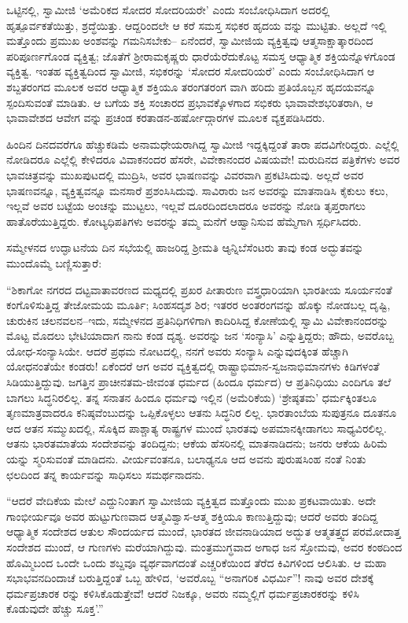 ಒಟ್ಟಿನಲ್ಲಿ, ಸ್ವಾಮೀಜಿ ‘ಅಮೆರಿಕದ ಸೋದರ ಸೋದರಿಯರೇ’ ಎಂದು ಸಂಬೋಧಿಸಿದಾಗ ಅದರಲ್ಲಿ ಹೃತ್ಪೂರ್ವಕತೆಯಿತ್ತು, ಶ್ರದ್ಧೆಯಿತ್ತು. ಆದ್ದರಿಂದಲೇ ಆ ಕರೆ ಸಮಸ್ತ ಸಭಿಕರ ಹೃದಯ ವನ್ನು ಮುಟ್ಟಿತು. ಅಲ್ಲದೆ ಇಲ್ಲಿ ಮತ್ತೊಂದು ಪ್ರಮುಖ ಅಂಶವನ್ನು ಗಮನಿಸಬೇಕು– ಏನೆಂದರೆ, ಸ್ವಾಮೀಜಿಯ ವ್ಯಕ್ತಿತ್ವವು ಆತ್ಮಸಾಕ್ಷಾತ್ಕಾರದಿಂದ ಪರಿಪೂರ್ಣಗೊಂಡ ವ್ಯಕ್ತಿತ್ವ; ಜೊತೆಗೆ ಶ್ರೀರಾಮಕೃಷ್ಣರು ಧಾರೆಯೆರೆದುಕೊಟ್ಟ ಸಮಸ್ತ ಆಧ್ಯಾತ್ಮಿಕ ಶಕ್ತಿಯನ್ನೊಳಗೊಂಡ ವ್ಯಕ್ತಿತ್ವ. ಇಂತಹ ವ್ಯಕ್ತಿತ್ವದಿಂದ ಸ್ವಾಮೀಜಿ, ಸಭಿಕರನ್ನು ‘ಸೋದರ ಸೋದರಿಯರೆ’ ಎಂದು ಸಂಬೋಧಿಸಿದಾಗ ಆ ಶಬ್ದತರಂಗದ ಮೂಲಕ ಅವರ ಆಧ್ಯಾತ್ಮಿಕ ಶಕ್ತಿಯೂ ತರಂಗತರಂಗ ವಾಗಿ ಹರಿದು ಪ್ರತಿಯೊಬ್ಬನ ಹೃದಯವನ್ನೂ ಸ್ಪಂದಿಸುವಂತೆ ಮಾಡಿತು. ಆ ಬಗೆಯ ಶಕ್ತಿ ಸಂಚಾರದ ಪ್ರಭಾವಕ್ಕೊಳಗಾದ ಸಭಿಕರು ಭಾವಾವೇಶಭರಿತರಾಗಿ, ಆ ಭಾವಾವೇಶದ ಆವೇಗ ವನ್ನು ಪ್ರಚಂಡ ಕರತಾಡನ-ಹರ್ಷೋದ್ಗಾರಗಳ ಮೂಲಕ ವ್ಯಕ್ತಪಡಿಸಿದರು.

ಹಿಂದಿನ ದಿನದವರೆಗೂ ಹೆಚ್ಚುಕಡಿಮೆ ಅನಾಮಧೇಯರಾಗಿದ್ದ ಸ್ವಾಮೀಜಿ ಇದ್ದಕ್ಕಿದ್ದಂತೆ ತಾರಾ ಪದವಿಗೇರಿದ್ದರು. ಎಲ್ಲೆಲ್ಲಿ ನೋಡಿದರೂ ಎಲ್ಲೆಲ್ಲಿ ಕೇಳಿದರೂ ವಿವಾಕನಂದರ ಹೆಸರೇ, ವಿವೇಕಾನಂದರ ವಿಷಯವೇ! ಮರುದಿನದ ಪತ್ರಿಕೆಗಳು ಅವರ ಭಾವಚಿತ್ರವನ್ನು ಮುಖಪುಟದಲ್ಲಿ ಮುದ್ರಿಸಿ, ಅವರ ಭಾಷಣವನ್ನು ವಿವರವಾಗಿ ಪ್ರಕಟಿಸಿದುವು. ಅಲ್ಲದೆ ಅವರ ಭಾಷಣವನ್ನೂ, ವ್ಯಕ್ತಿತ್ವವನ್ನೂ ಮನಸಾರೆ ಪ್ರಶಂಸಿಸಿದುವು. ಸಾವಿರಾರು ಜನ ಅವರನ್ನು ಮಾತನಾಡಿಸಿ ಕೈಕುಲು ಕಲು, ಇಲ್ಲವೆ ಅವರ ಬಟ್ಟೆಯ ಅಂಚನ್ನು ಮುಟ್ಟಲು, ಇಲ್ಲವೆ ದೂರದಿಂದಲಾದರೂ ಅವರನ್ನು ನೋಡಿ ತೃಪ್ತರಾಗಲು ಹಾತೊರೆಯುತ್ತಿದ್ದರು. ಕೋಟ್ಯಧಿಪತಿಗಳು ಅವರನ್ನು ತಮ್ಮ ಮನೆಗೆ ಆಹ್ವಾನಿಸುವ ಹೆಮ್ಮೆಗಾಗಿ ಸ್ಪರ್ಧಿಸಿದರು.

ಸಮ್ಮೇಳನದ ಉದ್ಘಾಟನೆಯ ದಿನ ಸಭೆಯಲ್ಲಿ ಹಾಜರಿದ್ದ ಶ್ರೀಮತಿ ಆ್ಯನ್ನಿಬೆಸೆಂಟರು ತಾವು ಕಂಡ ಅದ್ಭುತವನ್ನು ಮುಂದೊಮ್ಮೆ ಬಣ್ಣಿಸುತ್ತಾರೆ:

“ಶಿಕಾಗೋ ನಗರದ ದಟ್ಟವಾತಾವರಣದ ಮಧ್ಯದಲ್ಲಿ ಪ್ರಖರ ಪೀತಾರುಣ ವಸ್ತ್ರಧಾರಿಯಾಗಿ ಭಾರತೀಯ ಸೂರ್ಯನಂತೆ ಕಂಗೊಳಿಸುತ್ತಿದ್ದ ತೇಜೋಮಯ ಮೂರ್ತಿ; ಸಿಂಹಸದೃಶ ಶಿರ; ಇತರರ ಅಂತರಂಗವನ್ನು ಹೊಕ್ಕು ನೋಡಬಲ್ಲ ದೃಷ್ಟಿ, ಚುರುಕಿನ ಚಲನವಲನ–ಇದು, ಸಮ್ಮೇಳನದ ಪ್ರತಿನಿಧಿಗಳಿಗಾಗಿ ಕಾದಿರಿಸಿದ್ದ ಕೋಣೆಯಲ್ಲಿ ಸ್ವಾಮಿ ವಿವೇಕಾನಂದರನ್ನು ಮೊಟ್ಟ ಮೊದಲು ಭೇಟಿಯಾದಾಗ ನಾನು ಕಂಡ ದೃಶ್ಯ. ಅವರನ್ನು ಜನ ‘ಸಂನ್ಯಾಸಿ’ ಎನ್ನುತ್ತಿದ್ದರು; ಹೌದು, ಅವರೊಬ್ಬ ಯೋಧ-ಸಂನ್ಯಾಸಿಯೇ. ಆದರೆ ಪ್ರಥಮ ನೋಟದಲ್ಲಿ, ನನಗೆ ಅವರು ಸಂನ್ಯಾಸಿ ಎನ್ನುವುದಕ್ಕಿಂತ ಹೆಚ್ಚಾಗಿ ಯೋಧನಂತೆಯೇ ಕಂಡರು! ಏಕೆಂದರೆ ಆಗ ಅವರ ವ್ಯಕ್ತಿತ್ವದಲ್ಲಿ ರಾಷ್ಟ್ರಾಭಿಮಾನ-ಸ್ವಜನಾಭಿಮಾನಗಳು ಕಿಡಿಗಳಂತೆ ಸಿಡಿಯುತ್ತಿದ್ದುವು. ಜಗತ್ತಿನ ಪ್ರಾಚೀನತಮ-ಜೀವಂತ ಧರ್ಮದ (ಹಿಂದೂ ಧರ್ಮದ) ಆ ಪ್ರತಿನಿಧಿಯು ಎಂದಿಗೂ ತಲೆ ಬಾಗಲು ಸಿದ್ಧನಿರಲಿಲ್ಲ. ತನ್ನ ಸನಾತನ ಹಿಂದೂ ಧರ್ಮವು ಇಲ್ಲಿನ (ಅಮೆರಿಕೆಯ) ‘ಶ್ರೇಷ್ಠತಮ’ ಧರ್ಮಕ್ಕಿಂತಲೂ ತೃಣಮಾತ್ರವಾದರೂ ಕನಿಷ್ಠವೆಂಬುದನ್ನು ಒಪ್ಪಿಕೊಳ್ಳಲು ಆತನು ಸಿದ್ಧನಿರ ಲಿಲ್ಲ. ಭಾರತಾಂಬೆಯ ಸುಪುತ್ರನೂ ದೂತನೂ ಆದ ಆತನ ಸಮ್ಮುಖದಲ್ಲಿ, ಸೊಕ್ಕಿದ ಪಾಶ್ಚಾತ್ಯ ರಾಷ್ಟ್ರಗಳ ಮುಂದೆ ಭಾರತವು ಅಪಮಾನಕ್ಕೀಡಾಗಲು ಸಾಧ್ಯವಿರಲಿಲ್ಲ. ಆತನು ಭಾರತಮಾತೆಯ ಸಂದೇಶವನ್ನು ತಂದಿದ್ದನು; ಆಕೆಯ ಹೆಸರಿನಲ್ಲಿ ಮಾತನಾಡಿದನು; ಜನರು ಆಕೆಯ ಹಿರಿಮೆ ಯನ್ನು ಸ್ಮರಿಸುವಂತೆ ಮಾಡಿದನು. ವೀರ್ಯವಂತನೂ, ಬಲಾಢ್ಯನೂ ಆದ ಅವನು ಪುರುಷಸಿಂಹ ನಂತೆ ನಿಂತು ಛಲದಿಂದ ತನ್ನ ಕಾರ್ಯವನ್ನು ಸಾಧಿಸಲು ಸಮರ್ಥನಾದನು.

“ಆದರೆ ವೇದಿಕೆಯ ಮೇಲೆ ಎದ್ದುನಿಂತಾಗ ಸ್ವಾಮೀಜಿಯ ವ್ಯಕ್ತಿತ್ವದ ಮತ್ತೊಂದು ಮುಖ ಪ್ರಕಟವಾಯಿತು. ಅದೇ ಗಾಂಭೀರ್ಯವೂ ಅವರ ಹುಟ್ಟುಗುಣವಾದ ಆತ್ಮವಿಶ್ವಾಸ-ಆತ್ಮ ಶಕ್ತಿಯೂ ಕಾಣುತ್ತಿದ್ದುವು; ಆದರೆ ಅವರು ತಂದಿದ್ದ ಆಧ್ಯಾತ್ಮಿಕ ಸಂದೇಶದ ಆತುಲ ಸೌಂದರ್ಯದ ಮುಂದೆ, ಭಾರತದ ಜೀವನಾಡಿಯಾದ ಅದ್ಭುತ ಆತ್ಮತತ್ತ್ವದ ಪರಮೋದಾತ್ತ ಸಂದೇಶದ ಮುಂದೆ, ಆ ಗುಣಗಳು ಮರೆಯಾಗಿದ್ದುವು. ಮಂತ್ರಮುಗ್ಧವಾದ ಅಗಾಧ ಜನ ಸ್ತೋಮವು, ಅವರ ಕಂಠದಿಂದ ಹೊಮ್ಮಿಬಂದ ಒಂದೇ ಒಂದು ಶಬ್ದವೂ ವ್ಯರ್ಥವಾಗದಂತೆ ಎಚ್ಚರಿಕೆಯಿಂದ ತೆರೆದ ಕಿವಿಗಳಿಂದ ಆಲಿಸಿತು. ಆ ಮಹಾ ಸಭಾಭವನದಿಂದಾಚೆ ಬರುತ್ತಿದ್ದಂತೆ ಒಬ್ಬ ಹೇಳಿದ, ‘ಅವರೊಬ್ಬ “ಅನಾಗರಿಕ ವಿಧರ್ಮಿ”! ನಾವು ಅವರ ದೇಶಕ್ಕೆ ಧರ್ಮಪ್ರಚಾರಕ ರನ್ನು ಕಳಿಸಿಕೊಡುತ್ತೇವೆ! ಆದರೆ ನಿಜಕ್ಕೂ, ಅವರು ನಮ್ಮಲ್ಲಿಗೆ ಧರ್ಮಪ್ರಚಾರಕರನ್ನು ಕಳಿಸಿ ಕೊಡುವುದೇ ಹೆಚ್ಚು ಸೂಕ್ತ’.”


